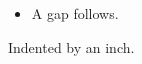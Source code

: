 \documentclass{article}
\begin{document}
\begin{itemize}
  \item A gap follows.
\end{itemize}
\vspace{12pt}
\hspace*{1in}Indented by an inch.
\end{document}
